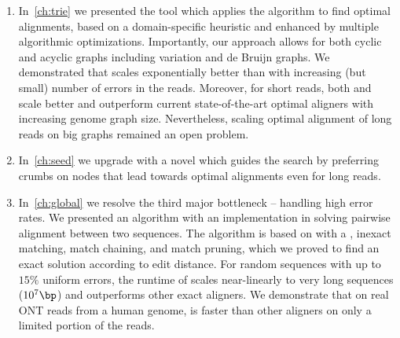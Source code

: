 \begin{enumerate}
	\item In~\cref{ch:trie} we presented the tool \astarix which applies the \A
algorithm to find optimal alignments, based on a domain-specific heuristic and
enhanced by multiple algorithmic optimizations. Importantly, our approach allows
for both cyclic and acyclic graphs including variation and de Bruijn graphs. We
demonstrated that \astarix scales exponentially better than \dijkstra with
increasing (but small) number of errors in the reads. Moreover, for short reads,
both \astarix and \dijkstra scale better and outperform current state-of-the-art
optimal aligners with increasing genome graph size. Nevertheless, scaling
optimal alignment of long reads on big graphs remained an open problem.
	\item In~\cref{ch:seed} we upgrade \astarix with a novel \seedh which guides
the search by preferring crumbs on nodes that lead towards optimal alignments
even for long reads.
	\item In~\cref{ch:global} we resolve the third major bottleneck -- handling
high error rates. We presented an algorithm with an implementation in \astarpa
solving pairwise alignment between two sequences. The algorithm is based on \A
with a \sh, inexact matching, match chaining, and match pruning, which we proved
to find an exact solution according to edit distance. For random sequences with
up to $15\%$ uniform errors, the runtime of \astarpa scales near-linearly to
very long sequences ($10^7\bp$) and outperforms other exact aligners. We
demonstrate that on real ONT reads from a human genome, \astarpa is faster than
other aligners on only a limited portion of the reads.
\end{enumerate}